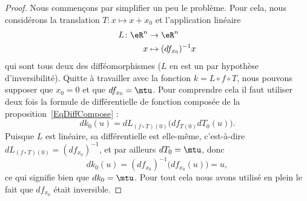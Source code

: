 \begin{proof}
    Nous commençons par simplifier un peu le problème. Pour cela, nous considérons la translation \( T\colon x\mapsto x+x_0 \) et l'application linéaire
    \begin{equation}
        \begin{aligned}
            L\colon \eR^n & \to \eR^n   \\
                      x   & \mapsto (df_{x_0})^{-1}x
        \end{aligned}
    \end{equation}
    qui sont tous deux des difféomorphismes (\( L\) en est un par hypothèse d'inversibilité). Quitte à travailler avec la fonction \( k=L\circ f\circ T\), nous pouvons supposer que \( x_0=0\) et que \( df_{x_0}=\mtu\). Pour comprendre cela il faut utiliser deux fois la formule de différentielle de fonction composée de la proposition~\ref{EqDiffCompose} :
    \begin{equation}
        dk_0(u)=dL_{(f\circ T)(0)}\Big( df_{T(0)}dT_0(u) \Big).
    \end{equation}
    Puisque \( L\) est linéaire, sa différentielle est elle-même, c'est-à-dire \( dL_{(f\circ T)(0)}=(df_{x_0})^{-1}\), et par ailleurs \( dT_0=\mtu\), donc
    \begin{equation}
        dk_0(u)=(df_{x_0})^{-1}\Big( df_{x_0}(u) \Big)=u,
    \end{equation}
    ce qui signifie bien que \( dk_0=\mtu\). Pour tout cela nous avons utilisé en plein le fait que \( df_{x_0}\) était inversible.


\end{proof}
